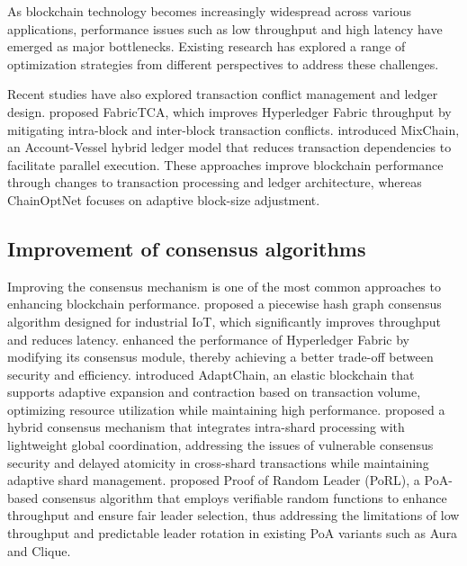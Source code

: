\documentclass[a4paper,fleqn]{cas-dc}
\begin{document}
As blockchain technology becomes increasingly widespread across various applications, performance issues such as low throughput and high latency have emerged as major bottlenecks. Existing research has explored a range of optimization strategies from different perspectives to address these challenges.

Recent studies have also explored transaction conflict management and ledger design. \citet{wu2026fabrictca} proposed FabricTCA, which improves Hyperledger Fabric throughput by mitigating intra-block and inter-block transaction conflicts. \citet{ma2026mixchain} introduced MixChain, an Account-Vessel hybrid ledger model that reduces transaction dependencies to facilitate parallel execution. These approaches improve blockchain performance through changes to transaction processing and ledger architecture, whereas ChainOptNet focuses on adaptive block-size adjustment.

\subsection{Improvement of consensus algorithms}
\vspace{6pt}
Improving the consensus mechanism is one of the most common approaches to enhancing blockchain performance. \citet{gao2021sharding} proposed a piecewise hash graph consensus algorithm designed for industrial IoT, which significantly improves throughput and reduces latency. \citet{zhang2021trustworthy} enhanced the performance of Hyperledger Fabric by modifying its consensus module, thereby achieving a better trade-off between security and efficiency. \citet{xu2023adaptchain} introduced AdaptChain, an elastic blockchain that supports adaptive expansion and contraction based on transaction volume, optimizing resource utilization while maintaining high performance.
\citet{li2024secure} proposed a hybrid consensus mechanism that integrates intra-shard processing with lightweight global coordination, addressing the issues of vulnerable consensus security and delayed atomicity in cross-shard transactions while maintaining adaptive shard management.
\citet{islam2025proof} proposed Proof of Random Leader (PoRL), a PoA-based consensus algorithm that employs verifiable random functions to enhance throughput and ensure fair leader selection, thus addressing the limitations of low throughput and predictable leader rotation in existing PoA variants such as Aura and Clique.
\end{document}
